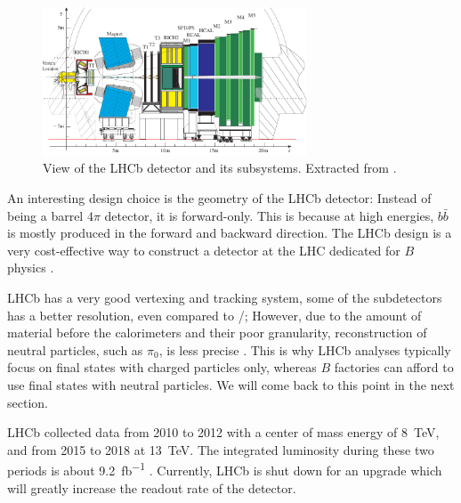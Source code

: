 \begin{figure}[ht]
    \centering
    \includegraphics[width=0.7\textwidth]{figs/lhcb_detector_view.pdf}
    \caption{
        View of the LHCb detector and its subsystems.
        Extracted from \cite{LHCb:2003ab}.
    }
    \label{fig:lhcb_detector_view}
\end{figure}

An interesting design choice is the geometry of the LHCb detector:
Instead of being a barrel $4\pi$ detector, it is forward-only.
This is because at high energies, $b\bar{b}$ is mostly produced in the forward
and backward direction.
The LHCb design is a very cost-effective way to construct a detector at the LHC
dedicated for $B$ physics \cite{LHCb:2008}.

LHCb has a very good vertexing and tracking system, some of the subdetectors has
a better resolution, even compared to \BaBar/;
However, due to the amount of material before the calorimeters and their poor
granularity,
reconstruction of neutral particles, such as $\pi_0$, is less
precise \cite{LHCb:2008,Guz:2017}.
This is why LHCb analyses typically focus on final states with charged particles
only, whereas $B$ factories can afford to use final states with neutral particles.
We will come back to this point in the next section.

LHCb collected data from 2010 to 2012 with a center of mass energy of
\SI{8}{TeV}, and from 2015 to 2018 at \SI{13}{TeV}.
The integrated luminosity during these two periods is about
\SI{9.2}{fb^{-1}} \cite{LHCb-Lumi:2019}.
Currently, LHCb is shut down for an upgrade which will greatly increase the
readout rate of the detector.


